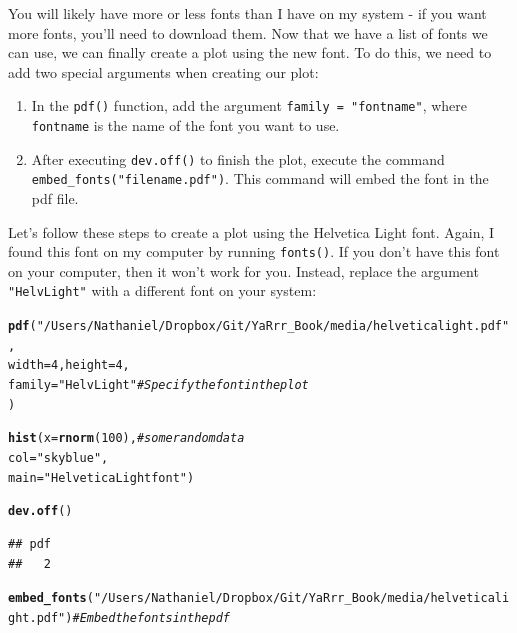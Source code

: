 \documentclass{tufte-book}\usepackage[]{graphicx}\usepackage[]{color}
\makeatletter
\newcommand{\hlnum}[1]{\textcolor[rgb]{0.686,0.059,0.569}{#1}}%
\newcommand{\hlstr}[1]{\textcolor[rgb]{0.192,0.494,0.8}{#1}}%
\newcommand{\hlcom}[1]{\textcolor[rgb]{0.678,0.584,0.686}{\textit{#1}}}%
\newcommand{\hlstd}[1]{\textcolor[rgb]{0.345,0.345,0.345}{#1}}%
\newcommand{\hlkwc}[1]{\textcolor[rgb]{0.333,0.667,0.333}{#1}}%
\newcommand{\hlkwd}[1]{\textcolor[rgb]{0.737,0.353,0.396}{\textbf{#1}}}%
\newenvironment{kframe}{%
 \def\at@end@of@kframe{}%
 \ifinner\ifhmode%
  \def\at@end@of@kframe{\end{minipage}}%
  \begin{minipage}{\columnwidth}%
 \fi\fi%
 \def\FrameCommand##1{\hskip\@totalleftmargin \hskip-\fboxsep
 \colorbox{shadecolor}{##1}\hskip-\fboxsep
     \hskip-\linewidth \hskip-\@totalleftmargin \hskip\columnwidth}%
 \MakeFramed {\advance\hsize-\width
   \@totalleftmargin\z@ \linewidth\hsize
   \@setminipage}}%
 {\par\unskip\endMakeFramed%
 \at@end@of@kframe}
\newenvironment{knitrout}{}{} %
\makeatother
\begin{document}
\begin{footnotesize}
You will likely have more or less fonts than I have on my system - if you want more fonts, you'll need to download them. Now that we have a list of fonts we can use, we can finally create a plot using the new font. To do this, we need to add two special arguments when creating our plot:

\begin{enumerate}
\item In the \texttt{pdf()} function, add the argument \texttt{family = "fontname"}, where \texttt{fontname} is the name of the font you want to use.
\item After executing \texttt{dev.off()} to finish the plot, execute the command \texttt{embed\_fonts("filename.pdf")}. This command will embed the font in the pdf file.
\end{enumerate}

Let's follow these steps to create a plot using the Helvetica Light font. Again, I found this font on my computer by running \texttt{fonts()}. If you don't have this font on your computer, then it won't work for you. Instead, replace the argument \texttt{"HelvLight"} with a different font on your system:


\begin{knitrout}
\color{fgcolor}\begin{kframe}
\begin{alltt}
\hlkwd{pdf}\hlstd{(}\hlstr{"/Users/Nathaniel/Dropbox/Git/YaRrr_Book/media/helveticalight.pdf"}\hlstd{,}
    \hlkwc{width} \hlstd{=} \hlnum{4}\hlstd{,} \hlkwc{height} \hlstd{=} \hlnum{4}\hlstd{,}
    \hlkwc{family} \hlstd{=} \hlstr{"HelvLight"} \hlcom{# Specify the font in the plot}
    \hlstd{)}

\hlkwd{hist}\hlstd{(}\hlkwc{x} \hlstd{=} \hlkwd{rnorm}\hlstd{(}\hlnum{100}\hlstd{),} \hlcom{# some random data}
     \hlkwc{col} \hlstd{=} \hlstr{"skyblue"}\hlstd{,}
     \hlkwc{main} \hlstd{=} \hlstr{"Helvetica Light font"}\hlstd{)}

\hlkwd{dev.off}\hlstd{()}
\end{alltt}
\begin{verbatim}
## pdf 
##   2
\end{verbatim}
\begin{alltt}
\hlkwd{embed_fonts}\hlstd{(}\hlstr{"/Users/Nathaniel/Dropbox/Git/YaRrr_Book/media/helveticalight.pdf"}\hlstd{)} \hlcom{# Embed the fonts in the pdf}
\end{alltt}
\end{kframe}
\end{knitrout}


\end{footnotesize}
\end{document}
